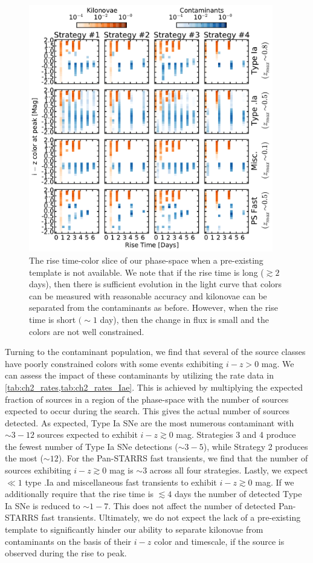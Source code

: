 \begin{figure}[t!]
\centering
\includegraphics[width=0.95\textwidth]{./figs/chapter2/ch2_f14.pdf}
\caption{The rise time-color slice of our phase-space when a pre-existing template is not available. We note that if the rise time is long ($\gtrsim2$ days), then there is sufficient evolution in the light curve that colors can be measured with reasonable accuracy and kilonovae can be separated from the contaminants as before. However, when the rise time is short $(\sim 1$ day), then the change in flux is small and the colors are not well constrained.}
\label{fig:ch2_phaserisediff}
\end{figure}

\clearpage
Turning to the contaminant population, we find that several of the source classes have poorly constrained colors with some events exhibiting $i-z > 0$ mag. We can assess the impact of these contaminants by utilizing the rate data in \cref{tab:ch2_rates,tab:ch2_rates_Iae}. This is achieved by multiplying the expected fraction of sources in a region of the phase-space with the number of sources expected to occur during the search. This gives the actual number of sources detected. As expected, Type Ia SNe are the most numerous contaminant with $\sim3-12$ sources expected to exhibit $i-z\gtrsim0$ mag. Strategies 3 and 4 produce the fewest number of Type Ia SNe detections ($\sim 3-5$), while Strategy 2 produces the most ($\sim 12$). For the Pan-STARRS fast transients, we find that the number of sources exhibiting $i-z\gtrsim0$ mag is $\sim3$ across all four strategies. Lastly, we expect $\ll1$ type .Ia and miscellaneous fast transients to exhibit $i-z\gtrsim0$ mag. If we additionally require that the rise time is $\lesssim 4$ days the number of detected Type Ia SNe is reduced to $\sim1-7$. This does not affect the number of detected Pan-STARRS fast transients. Ultimately, we do not expect the lack of a pre-existing template to significantly hinder our ability to separate kilonovae from contaminants on the basis of their $i-z$ color and timescale, if the source is observed during the rise to peak.


